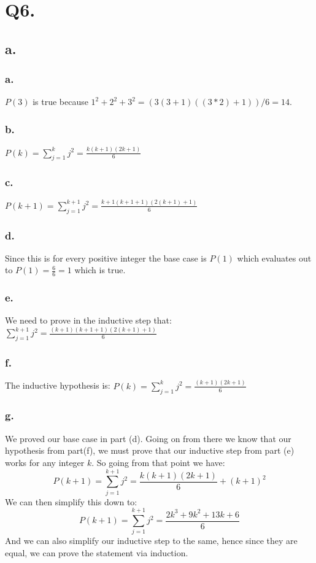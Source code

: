 \documentclass[titlepage]{article}\pagestyle{empty}
\begin{document}
\pagebreak
\section*{Q6.}
\subsection*{a.}
\subsubsection*{a.} 
$P(3)$ is true because $1^2 + 2^2+3^2 = (3(3+1)((3 * 2) + 1))/6 = 14$.
\subsubsection*{b.}
$P(k)=\sum_{j=1}^{k}j^2=\frac{k(k+1)(2k+1)}{6}$
\subsubsection*{c.}
$P(k+1)=\sum_{j=1}^{k+1}j^2=\frac{k+1(k+1+1)(2(k+1)+1)}{6}$
\subsubsection*{d.}
Since this is for every positive integer the base case is $P(1)$ which evaluates out to $P(1) = \frac{6}{6} = 1$ which is true.
\subsubsection*{e.}
We need to prove in the inductive step that: $\sum_{j=1}^{k+1}j^2=\frac{(k+1)(k+1+1)(2(k+1)+1)}{6}$
\subsubsection*{f.}
The inductive hypothesis is: $P(k)=\sum_{j=1}^{k}j^2=\frac{(k+1)(2k+1)}{6}$
\subsubsection*{g.}
We proved our base case in part (d). Going on from there we know that our hypothesis from part(f), we must prove that our inductive step from part (e) works for any integer $k$. So going from that point we have:
\[P(k+1)=\sum_{j=1}^{k+1}j^2=\frac{k(k+1)(2k+1)}{6} + (k+1)^2\] We can then simplify this down to:
\[P(k+1)=\sum_{j=1}^{k+1}j^2=\frac{2k^3+9k^2+13k+6}{6}\] And we can also simplify our inductive step to the same, hence since they are equal, we can prove the statement via induction.
\pagebreak
\end{document}
